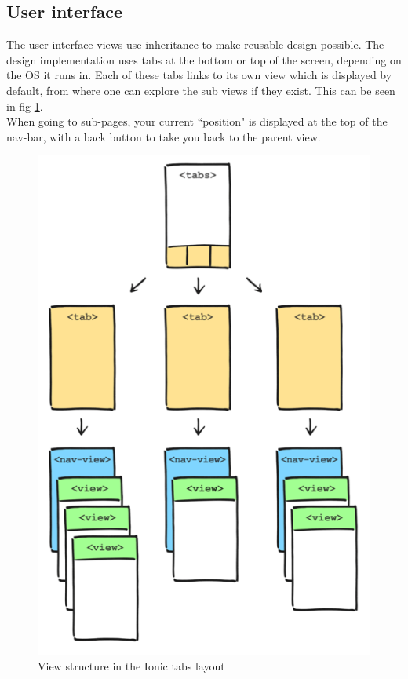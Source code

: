 \subsection{User interface}
The user interface views use inheritance to make reusable design possible. The design implementation uses tabs at the bottom or top of the screen, depending on the OS it runs in. Each of these tabs links to its own view which is displayed by default, from where one can explore the sub views if they exist. This can be seen in fig \ref{fig:tabs}.
\\
When going to sub-pages, your current ``position" is displayed at the top of the nav-bar, with a back button to take you back to the parent view.


\begin{figure}[!ht]
    \centering
    \includegraphics[scale=0.3]{images/tabviews.png}
    \caption{View structure in the Ionic tabs layout}
    \label{fig:tabs}
\end{figure}

